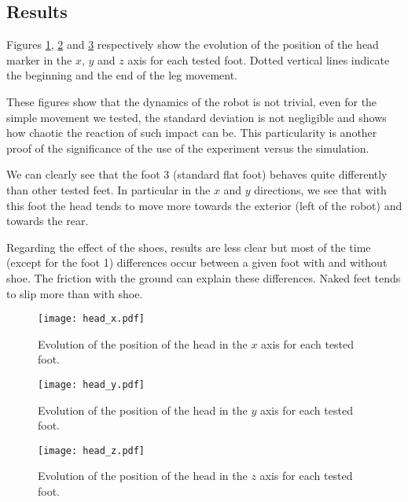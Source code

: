 \subsection{Results} %

Figures \ref{fig:head_x}, \ref{fig:head_y} and \ref{fig:head_z} respectively show the evolution of the position of the head marker in the $x$, $y$ and $z$ axis for each tested foot. Dotted vertical lines indicate the beginning and the end of the leg movement.

These figures show that the dynamics of the robot is not trivial, even for the simple movement we tested, the standard deviation is not negligible and shows how chaotic the reaction of such impact can be. This particularity is another proof of the significance of the use of the experiment versus the simulation.

We can clearly see that the foot 3 (standard flat foot) behaves quite differently than other tested feet. In particular in the $x$ and $y$ directions, we see that with this foot the head tends to move more towards the exterior (left of the robot) and towards the rear.

Regarding the effect of the shoes, results are less clear but most of the time (except for the foot 1) differences occur between a given foot with and without shoe. The friction with the ground can explain these differences. Naked feet tends to slip more than with shoe.



\begin{figure}[ht]
    \begin{center}
        \texttt{[image: head\_x.pdf]}
    \end{center}
    \caption{Evolution of the position of the head in the $x$ axis for
    each tested foot.}
    \label{fig:head_x}
\end{figure}

\begin{figure}[ht]
    \begin{center}
        \texttt{[image: head\_y.pdf]}
    \end{center}
    \caption{Evolution of the position of the head in the $y$ axis for
    each tested foot.}
    \label{fig:head_y}
\end{figure}

\begin{figure}[ht]
    \begin{center}
        \texttt{[image: head\_z.pdf]}
    \end{center}
    \caption{Evolution of the position of the head in the $z$ axis for
    each tested foot.}
    \label{fig:head_z}
\end{figure}


